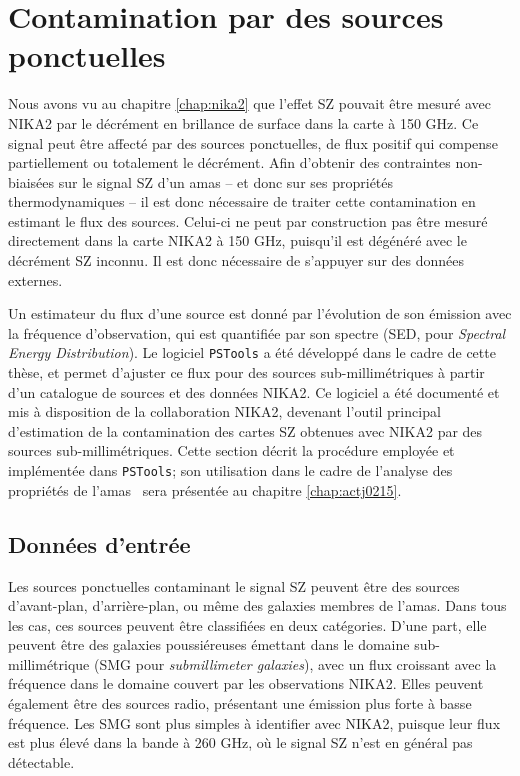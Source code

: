 \section{Contamination par des sources ponctuelles}
\label{sec:decor:pstools}

Nous avons vu au chapitre \ref{chap:nika2} que l'effet SZ pouvait être mesuré avec NIKA2 par le décrément en brillance de surface dans la carte à 150 GHz.
Ce signal peut être affecté par des sources ponctuelles, de flux positif qui compense partiellement ou totalement le décrément.
Afin d'obtenir des contraintes non-biaisées sur le signal SZ d'un amas -- et donc sur ses propriétés thermodynamiques -- il est donc nécessaire de traiter cette contamination en estimant le flux des sources.
Celui-ci ne peut par construction pas être mesuré directement dans la carte NIKA2 à 150 GHz, puisqu'il est dégénéré avec le décrément SZ inconnu.
Il est donc nécessaire de s'appuyer sur des données externes.

Un estimateur du flux d'une source est donné par l'évolution de son émission avec la fréquence d'observation, qui est quantifiée par son spectre (SED, pour \textit{Spectral Energy Distribution}).
Le logiciel \texttt{PSTools} a été développé dans le cadre de cette thèse, et permet d'ajuster ce flux pour des sources sub-millimétriques à partir d'un catalogue de sources et des données NIKA2.
Ce logiciel a été documenté \cite{keruzore_pstools_2019} et mis à disposition de la collaboration NIKA2, devenant l'outil principal d'estimation de la contamination des cartes SZ obtenues avec NIKA2 par des sources sub-millimétriques.
Cette section décrit la procédure employée et implémentée dans \texttt{PSTools}; son utilisation dans le cadre de l'analyse des propriétés de l'amas \act\ sera présentée au chapitre \ref{chap:actj0215}.

\subsection{Données d'entrée}

Les sources ponctuelles contaminant le signal SZ peuvent être des sources d'avant-plan, d'arrière-plan, ou même des galaxies membres de l'amas.
Dans tous les cas, ces sources peuvent être classifiées en deux catégories.
D'une part, elle peuvent être des galaxies poussiéreuses émettant dans le domaine sub-millimétrique (SMG pour \textit{submillimeter galaxies}), avec un flux croissant avec la fréquence dans le domaine couvert par les observations NIKA2.
Elles peuvent également être des sources radio, présentant une émission plus forte à basse fréquence\footnotemark.
Les SMG sont plus simples à identifier avec NIKA2, puisque leur flux est plus élevé dans la bande à 260 GHz, où le signal SZ n'est en général pas détectable.

